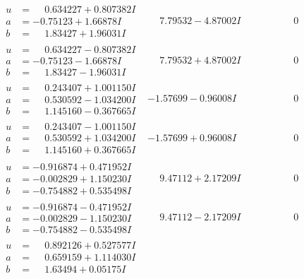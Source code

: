 \documentclass[1p]{elsarticle_modified}
\theoremstyle{definition}
\begin{document}
$$\begin{array}{c|c|c}
\begin{aligned}
u &= \phantom{-}0.634227 + 0.807382 I \\
a &= -0.75123 + 1.66878 I \\
b &= \phantom{-}1.83427 + 1.96031 I\end{aligned}
 & \phantom{-}7.79532 - 4.87002 I & \phantom{-0.000000 } 0 \\ \hline\begin{aligned}
u &= \phantom{-}0.634227 - 0.807382 I \\
a &= -0.75123 - 1.66878 I \\
b &= \phantom{-}1.83427 - 1.96031 I\end{aligned}
 & \phantom{-}7.79532 + 4.87002 I & \phantom{-0.000000 } 0 \\ \hline\begin{aligned}
u &= \phantom{-}0.243407 + 1.001150 I \\
a &= \phantom{-}0.530592 - 1.034200 I \\
b &= \phantom{-}1.145160 - 0.367665 I\end{aligned}
 & -1.57699 - 0.96008 I & \phantom{-0.000000 } 0 \\ \hline\begin{aligned}
u &= \phantom{-}0.243407 - 1.001150 I \\
a &= \phantom{-}0.530592 + 1.034200 I \\
b &= \phantom{-}1.145160 + 0.367665 I\end{aligned}
 & -1.57699 + 0.96008 I & \phantom{-0.000000 } 0 \\ \hline\begin{aligned}
u &= -0.916874 + 0.471952 I \\
a &= -0.002829 + 1.150230 I \\
b &= -0.754882 + 0.535498 I\end{aligned}
 & \phantom{-}9.47112 + 2.17209 I & \phantom{-0.000000 } 0 \\ \hline\begin{aligned}
u &= -0.916874 - 0.471952 I \\
a &= -0.002829 - 1.150230 I \\
b &= -0.754882 - 0.535498 I\end{aligned}
 & \phantom{-}9.47112 - 2.17209 I & \phantom{-0.000000 } 0 \\ \hline\begin{aligned}
u &= \phantom{-}0.892126 + 0.527577 I \\
a &= \phantom{-}0.659159 + 1.114030 I \\
b &= \phantom{-}1.63494 + 0.05175 I\end{aligned}

\end{array}$$
\end{document}
